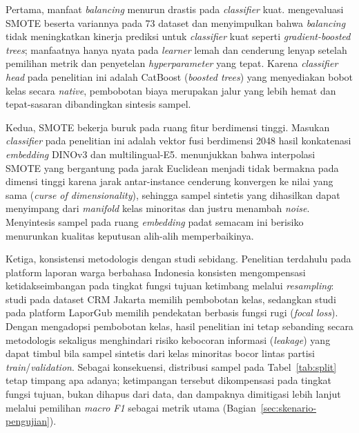 Pertama, manfaat \textit{balancing} menurun drastis pada \textit{classifier} kuat. \citet{elorToSMOTE2022} mengevaluasi SMOTE beserta variannya pada 73 dataset dan menyimpulkan bahwa \textit{balancing} tidak meningkatkan kinerja prediksi untuk \textit{classifier} kuat seperti \textit{gradient-boosted trees}; manfaatnya hanya nyata pada \textit{learner} lemah dan cenderung lenyap setelah pemilihan metrik dan penyetelan \textit{hyperparameter} yang tepat. Karena \textit{classifier head} pada penelitian ini adalah CatBoost (\textit{boosted trees}) yang menyediakan bobot kelas secara \textit{native}, pembobotan biaya merupakan jalur yang lebih hemat dan tepat-sasaran dibandingkan sintesis sampel.

Kedua, SMOTE bekerja buruk pada ruang fitur berdimensi tinggi. Masukan \textit{classifier} pada penelitian ini adalah vektor fusi berdimensi 2048 hasil konkatenasi \textit{embedding} DINOv3 dan multilingual-E5. \citet{maldonadoFWSMOTE2022} menunjukkan bahwa interpolasi SMOTE yang bergantung pada jarak Euclidean menjadi tidak bermakna pada dimensi tinggi karena jarak antar-instance cenderung konvergen ke nilai yang sama (\textit{curse of dimensionality}), sehingga sampel sintetis yang dihasilkan dapat menyimpang dari \textit{manifold} kelas minoritas dan justru menambah \textit{noise}. Menyintesis sampel pada ruang \textit{embedding} padat semacam ini berisiko menurunkan kualitas keputusan alih-alih memperbaikinya.

Ketiga, konsistensi metodologis dengan studi sebidang. Penelitian terdahulu pada platform laporan warga berbahasa Indonesia konsisten mengompensasi ketidakseimbangan pada tingkat fungsi tujuan ketimbang melalui \textit{resampling}: studi pada dataset CRM Jakarta \citep{hanifPenugasanOtomatis2024} memilih pembobotan kelas, sedangkan studi pada platform LaporGub \citep{zahroFairerPublicComplaint2025} memilih pendekatan berbasis fungsi rugi (\textit{focal loss}). Dengan mengadopsi pembobotan kelas, hasil penelitian ini tetap sebanding secara metodologis sekaligus menghindari risiko kebocoran informasi (\textit{leakage}) yang dapat timbul bila sampel sintetis dari kelas minoritas bocor lintas partisi \textit{train}/\textit{validation}. Sebagai konsekuensi, distribusi sampel pada Tabel~\ref{tab:split} tetap timpang apa adanya; ketimpangan tersebut dikompensasi pada tingkat fungsi tujuan, bukan dihapus dari data, dan dampaknya dimitigasi lebih lanjut melalui pemilihan \textit{macro F1} sebagai metrik utama (Bagian~\ref{sec:skenario-pengujian}).

